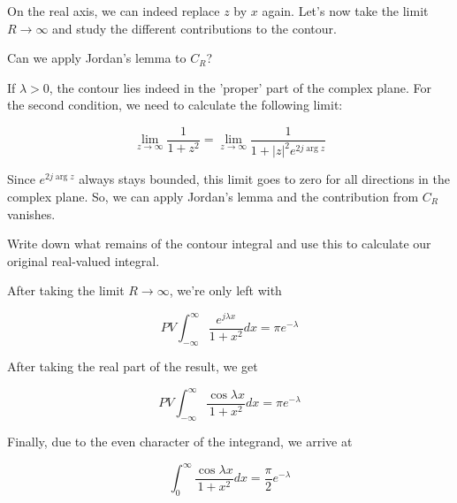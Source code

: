 On the real axis, we can indeed replace $z$ by $x$ again. Let's now take the limit $R \to \infty$ and study the different contributions to the contour.

\begin{cue}
Can we apply Jordan's lemma to ${C_R}$? 
\end{cue}

\noindent{}If $\lambda > 0$, the contour lies indeed in the 'proper' part of the complex plane. For the second condition, we need to calculate the following limit:

\begin{equation}
\lim_{z \to \infty}\frac{1}{1+z^2} = \lim_{z \to \infty}\frac{1}{1+|z|^2 e^{2 j
\arg z}}
\end{equation}

Since $e^{2 j \arg z}$ always stays bounded, this limit goes to zero for all directions in the complex plane. So, we can apply Jordan's lemma and the contribution from ${C_R}$ vanishes.

\begin{cue}
Write down what remains of the contour integral and use this to calculate our original real-valued integral.
\end{cue}

After taking the limit $R \to \infty$, we're only left with

\begin{equation}
PV \int_{-\infty}^{\infty}\frac{e^{j \lambda x}}{1 + x^2} dx = \pi e^{-\lambda}
\end{equation}

\noindent{}After taking the real part of the result, we get

\begin{equation}
PV \int_{-\infty}^{\infty}\frac{\cos \lambda x}{1 + x^2} dx = \pi e^{-\lambda}
\end{equation}

Finally, due to the even character of the integrand, we arrive at

\begin{equation}
\int_0^{\infty}\frac{\cos \lambda x}{1 + x^2} dx = \frac{\pi}{2} e^{-\lambda}
\end{equation}


